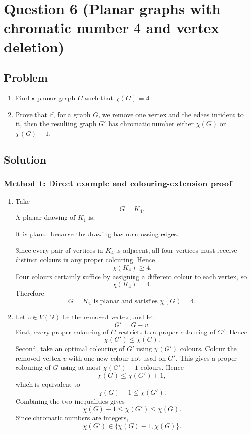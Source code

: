 \documentclass[12pt]{article}
\begin{document}
\section{Question 6 (Planar graphs with chromatic number $4$ and vertex deletion)}

\subsection{Problem}
\begin{enumerate}[label=(\alph*)]
  \item Find a planar graph $G$ such that $\chi(G)=4$.
  \item Prove that if, for a graph $G$, we remove one vertex and the edges incident to it, then the resulting graph $G'$ has chromatic number either $\chi(G)$ or $\chi(G)-1$.
\end{enumerate}

\subsection{Solution}

\subsubsection{Method 1: Direct example and colouring-extension proof}
\begin{enumerate}[label=(\alph*)]
  \item Take
  \[
  G=K_4.
  \]
  A planar drawing of $K_4$ is:
  \begin{center}
  \end{center}
  It is planar because the drawing has no crossing edges.

  Since every pair of vertices in $K_4$ is adjacent, all four vertices must receive distinct colours in any proper colouring. Hence
  \[
  \chi(K_4)\ge 4.
  \]
  Four colours certainly suffice by assigning a different colour to each vertex, so
  \[
  \chi(K_4)=4.
  \]
  Therefore
  \[
  \boxed{G=K_4\text{ is planar and satisfies }\chi(G)=4.}
  \]

  \item Let $v\in V(G)$ be the removed vertex, and let
  \[
  G'=G-v.
  \]
  First, every proper colouring of $G$ restricts to a proper colouring of $G'$. Hence
  \[
  \chi(G')\le \chi(G).
  \]
  Second, take an optimal colouring of $G'$ using $\chi(G')$ colours. Colour the removed vertex $v$ with one new colour not used on $G'$. This gives a proper colouring of $G$ using at most $\chi(G')+1$ colours. Hence
  \[
  \chi(G)\le \chi(G')+1,
  \]
  which is equivalent to
  \[
  \chi(G)-1\le \chi(G').
  \]
  Combining the two inequalities gives
  \[
  \chi(G)-1\le \chi(G')\le \chi(G).
  \]
  Since chromatic numbers are integers,
  \[
  \boxed{\chi(G')\in\{\chi(G)-1,\chi(G)\}.}
  \]
\end{enumerate}
\end{document}

